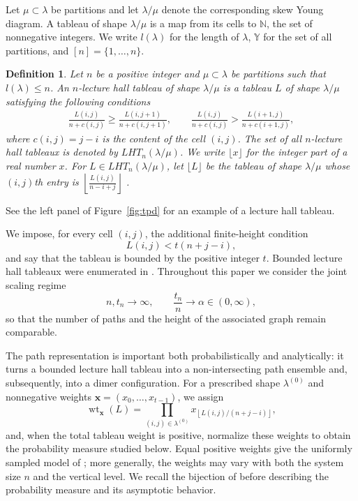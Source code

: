 \documentclass[11pt]{amsart}
\newcommand{\compliancerevision}[1]{{\color{black}#1}}
\newenvironment{introrevision}{\begingroup\color{black}}{\endgroup}
\theoremstyle{plain}
\newtheorem{definition}[theorem]{Definition}
\newcommand\NN{{\mathbb N}}
\newcommand\YY{{\mathbb {Y}}}
\numberwithin{equation}{section}
\numberwithin{theorem}{section}
\numberwithin{figure}{section}
\begin{document}
\begin{introrevision}
Let $\mu\subset\lambda$ be partitions and let $\lambda/\mu$ denote
the corresponding skew Young diagram. A tableau of shape
$\lambda/\mu$ is a map from its cells to $\NN$, the set of
nonnegative integers. We write $l(\lambda)$ for the length of
$\lambda$, $\YY$ for the set of all partitions, and
$[n]=\{1,\ldots,n\}$.
\end{introrevision}
 



\begin{definition}Let $n$ be a \compliancerevision{positive }integer and $\mu\subset \lambda$ be partitions such that $l(\lambda)\leq n$.
An $n$-lecture hall tableau of shape $\lambda/\mu$ is a tableau $L$ of shape $\lambda/\mu$ satisfying the following conditions
\begin{align*}
\frac{L(i,j)}{n+c(i,j)}\geq \frac{L(i,j+1)}{n+c(i,j+1)},\qquad
\frac{L(i,j)}{n+c(i,j)}> \frac{L(i+1,j)}{n+c(i+1,j)},
\end{align*}
where $c(i,j)=j-i$ is the content of the cell $(i,j)$. The set of all $n$-lecture hall tableaux is denoted by $LHT_n(\lambda/\mu)$. We write $\lfloor x\rfloor$ for the integer part of a real number $x$. For $L\in LHT_n(\lambda/\mu)$, let $\lfloor L\rfloor$ be the tableau of shape $\lambda/\mu$ whose $(i,j)$th entry is 
   $\left\lfloor\frac{L(i,j)}{n-i+j}\right\rfloor$ .
\end{definition}
See the left panel of Figure~\ref{fig:tpd} for an example of a lecture hall tableau.



\begin{introrevision}
We impose, for every cell $(i,j)$, the additional finite-height condition
\[
    L(i,j)<t(n+j-i),
\]
and say that the tableau is bounded by the positive integer $t$. Bounded lecture hall
tableaux were enumerated in \cite{CK20}. Throughout this paper we
consider the joint scaling regime
\[
    n,t_n\longrightarrow\infty,
    \qquad
    \frac{t_n}{n}\longrightarrow\alpha\in(0,\infty),
\]
so that the number of paths and the height of the associated graph
remain comparable.

The path representation is important both probabilistically and
analytically: it turns a bounded lecture hall tableau into a
non-intersecting path ensemble and, subsequently, into a dimer
configuration. For a prescribed shape $\lambda^{(0)}$ and nonnegative weights
$\mathbf x=(x_0,\ldots,x_{t-1})$, we assign
\[
    \operatorname{wt}_{\mathbf x}(L)
    =
    \prod_{(i,j)\in\lambda^{(0)}}
    x_{\left\lfloor L(i,j)/(n+j-i)\right\rfloor},
\]
and, when the total tableau weight is positive, normalize these weights to obtain the
probability measure studied below. Equal positive weights give the uniformly sampled model of
\cite{SKN21}; more generally, the weights may vary with both the
system size $n$ and the vertical level. We recall the bijection
of \cite{CK20} before
describing the probability measure and its asymptotic behavior.
\end{introrevision}
\end{document}

